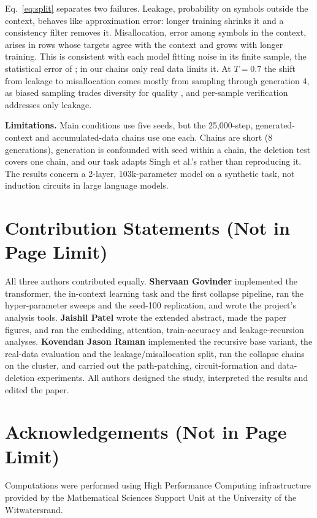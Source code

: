\documentclass[10pt,letterpaper]{article}
\begin{document}
Eq.~\ref{eq:split} separates two failures. Leakage, probability on symbols outside the context, behaves like approximation error: longer training shrinks it and a consistency filter removes it. Misallocation, error among symbols in the context, arises in rows whose targets agree with the context and grows with longer training. This is consistent with each model fitting noise in its finite sample, the statistical error of \citet{shumailov2024collapse}; in our chains only real data limits it. At $T{=}0.7$ the shift from leakage to misallocation comes mostly from sampling through generation 4, as biased sampling trades diversity for quality \citep{alemohammad2024mad}, and per-sample verification \citep{feng2025beyond} addresses only leakage.

\textbf{Limitations.} Main conditions use five seeds, but the 25{,}000-step, generated-context and accumulated-data chains use one each. Chains are short (8 generations), generation is confounded with seed within a chain, the deletion test covers one chain, and our task adapts Singh et al.'s rather than reproducing it. The results concern a 2-layer, 103k-parameter model on a synthetic task, not induction circuits in large language models.

\section{Contribution Statements (Not in Page Limit)}
All three authors contributed equally. \textbf{Shervaan Govinder} implemented the transformer, the in-context learning task and the first collapse pipeline, ran the hyper-parameter sweeps and the seed-100 replication, and wrote the project's analysis tools. \textbf{Jaishil Patel} wrote the extended abstract, made the paper figures, and ran the embedding, attention, train-accuracy and leakage-recursion analyses. \textbf{Kovendan Jason Raman} implemented the recursive base variant, the real-data evaluation and the leakage/misallocation split, ran the collapse chains on the cluster, and carried out the path-patching, circuit-formation and data-deletion experiments. All authors designed the study, interpreted the results and edited the paper.

\section{Acknowledgements (Not in Page Limit)}
Computations were performed using High Performance Computing infrastructure provided by the Mathematical Sciences Support Unit at the University of the Witwatersrand.
\end{document}
